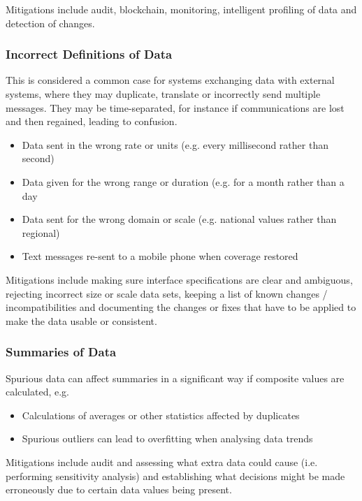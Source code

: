 Mitigations include audit, blockchain, monitoring, intelligent profiling of data and detection of changes.

\subsubsection{Incorrect Definitions of Data}
This is considered a common case for systems exchanging data with external systems, where they may duplicate, translate or incorrectly send multiple messages. They may be time-separated, for instance if communications are lost and then regained, leading to confusion.
\begin{itemize}
    \item Data sent in the wrong rate or units (e.g. every millisecond rather than second)
    \item Data given for the wrong range or duration (e.g. for a month rather than a day
    \item Data sent for the wrong domain or scale (e.g. national values rather than regional)
    \item Text messages re-sent to a mobile phone when coverage restored
\end{itemize}

Mitigations include making sure interface specifications are clear and ambiguous, rejecting incorrect size or scale data sets, keeping a list of known changes / incompatibilities and documenting the changes or fixes that have to be applied to make the data usable or consistent.

\subsubsection{Summaries of Data}
Spurious data can affect summaries in a significant way if composite values are calculated, e.g.
\begin{itemize}
    \item Calculations of averages or other statistics affected by duplicates
    \item Spurious outliers can lead to overfitting when analysing data trends
\end{itemize}

Mitigations include audit and assessing what extra data could cause (i.e. performing sensitivity analysis) and establishing what decisions might be made erroneously due to certain data values being present.	

